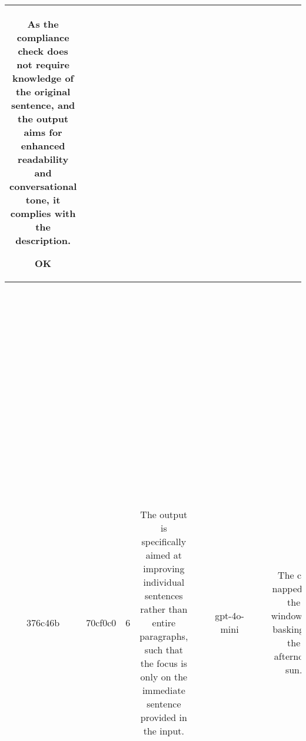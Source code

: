 \begin{table}[h!]
\begin{tabular}{|c|c|c|c|c|c|c|c|c|c|c|}
As the compliance check does not require knowledge of the original sentence, and the output aims for enhanced readability and conversational tone, it complies with the description.

OK\\
\hline
376c46b & 70cf0c0 & 6 & The output is specifically aimed at improving individual sentences rather than entire paragraphs, such that the focus is only on the immediate sentence provided in the input. &  & gpt-4o-mini &  & The cat napped on the windowsill, basking in the afternoon sun. & The cat curled up on the windowsill, soaking in the warm afternoon sunlight. & ok & The evaluation is focused on whether the chatbot output is readable, conversational, and engaging while preserving the original meaning. In this case, the sentence is straightforward, and the language used is simple and easy to relate to. The output describes an action taken by a cat (curling up on the windowsill) and its effect (soaking in the warm afternoon sunlight) using common, relatable language. The structure is fluid, with no unnecessarily complex phrases. It does not contain any elements that make it difficult to understand or deviate from the purpose of enhancing readability and conversational style.

No violation.
OK\\
\hline
376c46b & 70cf0c0 & 6 & The output is specifically aimed at improving individual sentences rather than entire paragraphs, such that the focus is only on the immediate sentence provided in the input. &  & qwen2.5:3b &  & The cat napped on the windowsill, basking in the afternoon sun. & Sure! Here’s a more conversational version of that sentence:

"The cat took a nap on the windowsill, enjoying the warm rays of the afternoon sun." & ok & The chatbot output provides a sentence that is simple, easy to understand, and uses language that is relatable. However, without the original sentence (input), it is not possible to definitively conclude whether the output maintains the original meaning and factual accuracy or whether the sentence has been rewritten to enhance readability. Furthermore, the chatbot output does not generate a sentence that has complex phrases that have been simplified since the complexity of the original input sentence is unknown. Thus, the evaluation of simplification, preservation of the original meaning, and factual accuracy cannot be assessed. Despite this limitation, the output does seem conversational and fluid based on structural dynamics alone.


\end{tabular}
\end{table}
